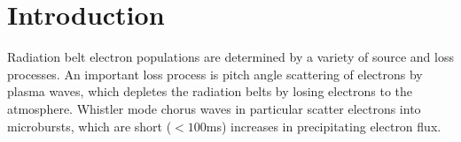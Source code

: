 \documentclass[draft]{agujournal2019}
\begin{document}

%
%

%
%


\begin{abstract}
(passive vs active?)
We present a collection of bouncing microbursts observed by the HILT instrument on SAMPEX from 1994-2004.
The statistical properties of these microbursts are analyzed, and an estimate of their scale sizes are obtained. 
We find that that the majority of bouncing microbursts observed by SAMPEX have scale sizes on the order of $10^2km$. 
\end{abstract}






\section{Introduction}
Radiation belt electron populations are determined by a variety of source and loss processes. 
An important loss process is pitch angle scattering of electrons by plasma waves, which depletes the radiation belts by losing electrons to the atmosphere. 
Whistler mode chorus waves in particular scatter electrons into microbursts, which are short ($<100$ms) increases in precipitating electron flux. 
\end{document}
